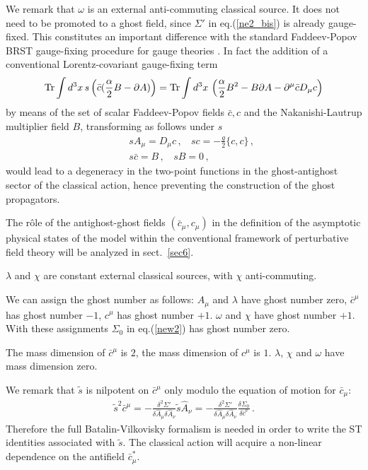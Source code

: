 \documentclass[a4paper,11pt]{article}
\begin{document}
We remark that 
$\omega$ is an external anti-commuting classical source.
It does not need to be promoted to a ghost field, since
$\Sigma'$ in eq.(\ref{ne2_bis}) is already gauge-fixed.
This constitutes an important difference with the standard Faddeev-Popov
BRST gauge-fixing procedure for gauge theories \cite{Weinberg:kr}.
In fact the addition of a conventional Lorentz-covariant
gauge-fixing term
%
\begin{eqnarray}
{\rm Tr} \int d^3x \, s \left ( \bar c ( \frac{\alpha}{2} B - \partial A ) \right ) =
{\rm Tr} \int d^3x \, \left ( \frac{\alpha}{2}B^2 - B \partial A 
- \partial^\mu \bar c D_\mu c \right )
\label{convFP}
\end{eqnarray}
%
by means of the set of scalar Faddeev-Popov fields $\bar c,c$
and the Nakanishi-Lautrup multiplier field $B$,
transforming as follows under $s$
%
\begin{eqnarray}
&& s A_\mu = D_\mu c \, , ~~~~ sc = -\frac{g}{2} \{ c,c \} \, , 
\nonumber \\
&& s \bar c = B \,  , ~~~~ s B = 0 \, , 
\label{convBRST}
\end{eqnarray}
%
would lead
to a degeneracy in the two-point functions in the 
 ghost-antighost sector of the classical action, hence
preventing the construction of the ghost propagators.

The r\^ole of the antighost-ghost fields $(\bar c_\mu,c_\mu)$
in the definition of the asymptotic physical states
of the model within the conventional framework
of perturbative field theory will be analyzed in sect.~\ref{sec6}.

\par

$\lambda$ and $\chi$ are constant external classical sources,
with $\chi$ anti-commuting.

We can assign the ghost number as follows: $A_\mu$ and $\lambda$
have ghost number zero, $\bar c^\mu$ has ghost number $-1$, 
$c^\mu$ has ghost number $+1$. $\omega$ and $\chi$ have ghost number $+1$.
With these assignments $\Sigma_0$ in eq.(\ref{new2}) has ghost number zero.

The mass dimension of $\bar c^\mu$ is $2$, the mass dimension of 
$c^\mu$ is $1$. $\lambda$, $\chi$ and $\omega$ have mass dimension zero.

We remark that 
$\tilde s$ is nilpotent on $\bar c^\mu$ only modulo the equation of motion for 
${\bar c}_\mu$:
%
\begin{eqnarray}
\tilde s^2 \bar c^\mu = - 
\frac{\delta^2 \Sigma'}{\delta \hat A_\mu \delta \hat A_\nu}
\tilde s \hat A_\nu = - 
\frac{\delta^2 \Sigma'}{\delta \hat A_\mu \delta \hat A_\nu}
\frac{\delta \Sigma_0}{\delta \bar c^\nu} \, .
\label{new2.1}
\end{eqnarray}
%
 Therefore the full Batalin-Vilkovisky formalism is needed
\cite{gomis} in order to write the ST identities associated
with $\tilde s$. The classical 
action will acquire a non-linear dependence on the
antifield $\bar c^*_\mu$. 
\end{document}
